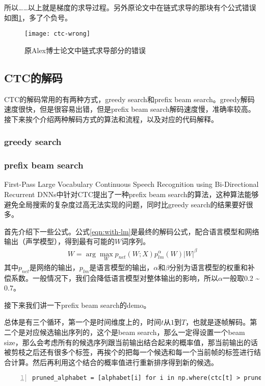 {{所以……以上就是梯度的求导过程。另外原论文中在链式求导的那块有个公式错误如图\ref{fig:ctc-error}，多了个负号。
\begin{figure}[h]
  \centering
  \texttt{[image: ctc-wrong]}
  \caption{原Alex博士论文中链式求导部分的错误 \label{fig:ctc-error}}
\end{figure}

\subsection{CTC的解码}
CTC的解码常用的有两种方式，greedy search和prefix beam search。greedy解码速度很快，但是很容易出错，但是prefix beam search解码速度慢，准确率较高。接下来挨个介绍两种解码方式的算法和流程，以及对应的代码解释。

\subsubsection{greedy search}


\subsubsection{prefix beam search}
First-Pass Large Vocabulary Continuous Speech Recognition using Bi-Directional Recurrent DNNs中针对CTC提出了一种prefix beam search的算法，这种算法能够避免全局搜索的复杂度过高无法实现的问题，同时比greedy search的结果要好很多。

首先介绍下一些公式。公式\ref{eqn:with-lm}是最终的解码公式，配合语言模型和网络输出（声学模型），得到最有可能的$W$词序列。
\begin{align}
\label{eqn:with-lm}
W = \arg\mathop{\max}_{W}p_{net}(W;X)p_{lm}^{\alpha}(W)|W|^{\beta}
\end{align}
其中$p_{net}$是网络的输出，$p_{lm}$是语言模型的输出，$\alpha$和$\beta$分别为语言模型的权重和补偿系数。一般情况下，我们会降低语言模型对整体输出的影响，所以$\alpha$一般取$0.2$ \~ $0.7$。

接下来我们讲一下prefix beam search的demo。

总体是有三个循环，第一个是时间维度上的，时间$t$从$1$到$T$，也就是逐帧解码。第二个是对应候选输出序列的，这个是beam search，那么一定得设置一个beam size，那么会考虑所有的候选序列跟当前输出结合起来的概率值，那当前输出的话被剪枝之后还有很多个标签，再挨个的把每一个候选和每一个当前帧的标签进行结合计算。然后再利用这个结合的概率值进行重新排序得到新的候选。

\begin{lstlisting}[language = shell, numbers=left, 
         numberstyle=\tiny,keywordstyle=\color{blue!70},
         commentstyle=\color{red!50!green!50!blue!50},frame=shadowbox,
         rulesepcolor=\color{red!20!green!20!blue!20},basicstyle=\ttfamily]
pruned_alphabet = [alphabet[i] for i in np.where(ctc[t] > prune)[0]]
\end{lstlisting}

}}
